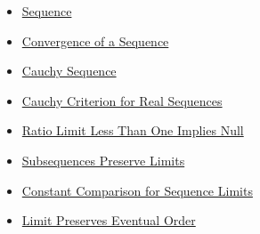 \begin{dependencies}
\begin{itemize}
  \item \hyperref[def:sequence]{Sequence}
  \item \hyperref[def:convergent-sequence]{Convergence of a Sequence}
  \item \hyperref[def:cauchy-sequence]{Cauchy Sequence}
  \item \hyperref[thm:cauchy-criterion-real-sequences]{Cauchy Criterion for Real Sequences}
  \item \hyperref[thm:ratio-limit-less-than-one-implies-null]{Ratio Limit Less Than One Implies Null}
  \item \hyperref[thm:subsequences-preserve-limits]{Subsequences Preserve Limits}
  \item \hyperref[thm:constant-comparison-sequence-limits]{Constant Comparison for Sequence Limits}
  \item \hyperref[thm:limit-preserves-eventual-order]{Limit Preserves Eventual Order}
\end{itemize}
\end{dependencies}

\clearpage
\fi

